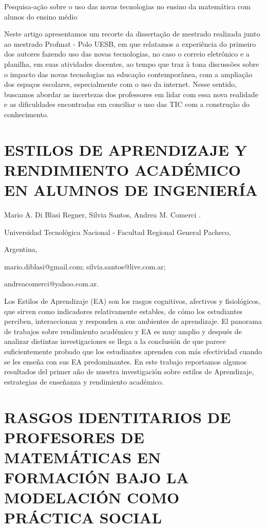 Pesquisa-ação sobre o uso das novas tecnologias no ensino da matemática
com alunos do ensino médio

Neste artigo apresentamos um recorte da dissertação de mestrado realizada
junto ao mestrado Profmat - Polo UESB, em que relatamos a experiência
do primeiro dos autores fazendo uso das novas tecnologias, no caso
o correio eletrônico e a planilha, em suas atividades docentes, ao
tempo que traz à tona discussões sobre o impacto das novas tecnologias
na educação contemporânea, com a ampliação dos espaços escolares,
especialmente com o uso da internet. Nesse sentido, buscamos abordar
as incertezas dos professores em lidar com essa nova realidade e as
dificuldades encontradas em conciliar o uso das TIC com a construção
do conhecimento. 


\section{\uppercase{ Estilos de aprendizaje y rendimiento académico en alumnos
de Ingeniería}}

\begin{datos}

Mario A. Di Blasi Regner, Silvia Santos, Andrea M. Comerci .

Universidad Tecnológica Nacional - Facultad Regional General Pacheco,

Argentina,

mario.diblasi@gmail.com; silvia.santos@live.com.ar;

andreacomerci@yahoo.com.ar.

\end{datos}

Los Estilos de Aprendizaje (EA) son los rasgos cognitivos, afectivos
y fisiológicos, que sirven como indicadores relativamente estables,
de cómo los estudiantes perciben, interaccionan y responden a sus
ambientes de aprendizaje. El panorama de trabajos sobre rendimiento
académico y EA es muy amplio y después de analizar distintas investigaciones
se llega a la conclusión de que parece suficientemente probado que
los estudiantes aprenden con más efectividad cuando se les enseña
con sus EA predominantes. En este trabajo reportamos algunos resultados
del primer año de nuestra investigación sobre estilos de Aprendizaje,
estrategias de enseñanza y rendimiento académico.


\section{RASGOS IDENTITARIOS DE PROFESORES DE MATEMÁTICAS EN FORMACIÓN BAJO
LA MODELACIÓN COMO PRÁCTICA SOCIAL}

